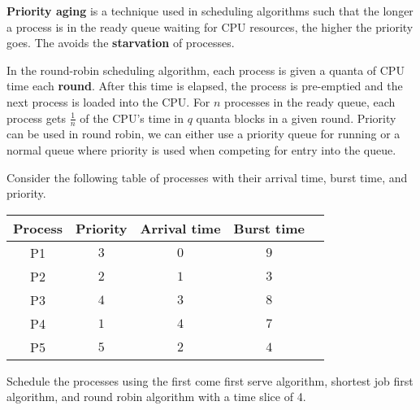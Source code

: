 \begin{definition}
    \textbf{Priority aging} is a technique used in scheduling algorithms such that the longer a process is in the ready queue waiting for CPU resources, the higher the priority goes. The avoids the \textbf{starvation} of processes.
\end{definition}

\begin{definition}
    In the round-robin scheduling algorithm, each process is given a quanta of CPU time each \textbf{round}. After this time is elapsed, the process is pre-emptied and the next process is loaded into the CPU. For $n$ processes in the ready queue, each process gets $\frac{1}{n}$ of the CPU's time in $q$ quanta blocks in a given round. Priority can be used in round robin, we can either use a priority queue for running or a normal queue where priority is used when competing for entry into the queue.
\end{definition}

\begin{example}
    Consider the following table of processes with their arrival time, burst time, and priority. 
    \begin{center}
        \begin{tabular}{ccccc}
            \toprule
            Process & Priority & Arrival time & Burst time \\
            \midrule
            P1 & $3$ & $0$ & $9$ \\
            P2 & $2$ & $1$ & $3$ \\
            P3 & $4$ & $3$ & $8$ \\
            P4 & $1$ & $4$ & $7$ \\
            P5 & $5$ & $2$ & $4$ \\
            \bottomrule
        \end{tabular}
    \end{center}
    Schedule the processes using the first come first serve algorithm, shortest job first algorithm, and round robin algorithm with a time slice of 4.
\end{example}

